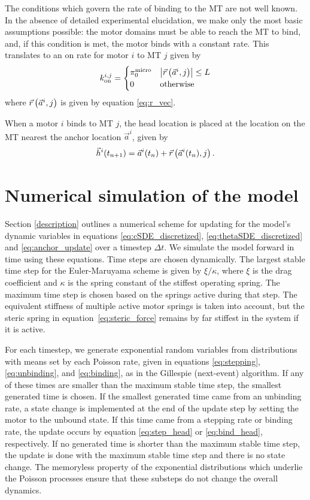 The conditions which govern the rate of binding to the MT are not well known. In the absence of detailed experimental elucidation, we make only the most basic assumptions possible: the motor domains must be able to reach the MT to bind, and, if this condition is met, the motor binds with a constant rate. This translates to an on rate for motor $i$ to MT $j$ given by
\begin{equation} \label{eq:binding}
k_\text{on}^{i,j} = 
\begin{cases}
\pi_0^{\text{micro}} & \abs{ \vec{r} \left(\vec{a}^i , j \right) } \leq L\\
0 & \text{otherwise}
\end{cases}
\end{equation}
where $\vec{r} \left(\vec{a}^i , j \right)$ is given by equation \ref{eq:r_vec}.

When a motor $i$ binds to MT $j$, the head location is placed at the location on the MT nearest the anchor location $\vec{a}^i$, given by 
\begin{equation} \label{eq:bind_head}
\vec{h}^i(t_{n+1})=\vec{a}^i(t_n) + \vec{r} \left(\vec{a}^i(t_n) , j \right).
\end{equation}

\section{Numerical simulation of the model} \label{sec:simulation}

Section \ref{description} outlines a numerical scheme for updating for the model's dynamic variables in equations \ref{eq:cSDE_discretized}, \ref{eq:thetaSDE_discretized} and \ref{eq:anchor_update} over a timestep $\Delta t$. We simulate the model forward in time using these equations. Time steps are chosen dynamically. The largest stable time step for the Euler-Maruyama scheme is given by $\xi/\kappa$, where $\xi$ is the drag coefficient and $\kappa$ is the spring constant of the stiffest operating spring. The maximum time step is chosen based on the springs active during that step. The equivalent stiffness of multiple active motor springs is taken into account, but the steric spring in equation~\ref{eq:steric_force} remains by far stiffest in the system if it is active. 

For each timestep, we generate exponential random variables from distributions with means set by each Poisson rate, given in equations \ref{eq:stepping}, \ref{eq:unbinding}, and \ref{eq:binding}, as in the Gillespie (next-event) algorithm. If any of these times are smaller than the maximum stable time step, the smallest generated time is chosen. If the smallest generated time came from an unbinding rate, a state change is implemented at the end of the update step by setting the motor to the unbound state. If this time came from a stepping rate or binding rate, the update occurs by equation \ref{eq:step_head} or \ref{eq:bind_head}, respectively. If no generated time is shorter than the maximum stable time step, the update is done with the maximum stable time step and there is no state change. The memoryless property of the exponential distributions which underlie the Poisson processes ensure that these substeps do not change the overall dynamics.

